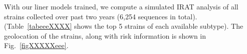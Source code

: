 \documentclass[onecolumn, compsoc,10pt]{IEEEtran}
\begin{document}
With our liner models trained, we compute a simulated IRAT analysis of all \infl strains collected over past two years (6,254 sequences in total).
(Table~\ref{tabeeeXXXX} shows the top 5 strains of each available subtype). The geolocation of the strains, along with risk information is shown in Fig.~\ref{figXXXXXeee}.











\end{document}
